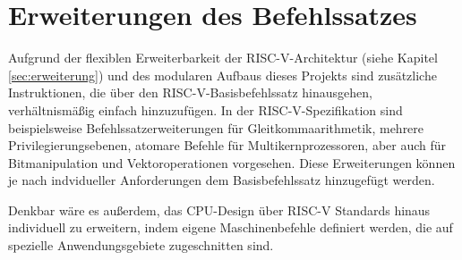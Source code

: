 \section{Erweiterungen des Befehlssatzes}

Aufgrund der flexiblen Erweiterbarkeit der RISC-V-Architektur (siehe Kapitel \ref{sec:erweiterung}) und des modularen Aufbaus dieses Projekts sind zusätzliche Instruktionen, die über den RISC-V-Basisbefehlssatz hinausgehen, verhältnismäßig einfach hinzuzufügen. In der RISC-V-Spezifikation sind beispielsweise Befehlssatzerweiterungen für Gleitkommaarithmetik, mehrere Privilegierungsebenen, atomare Befehle für Multikernprozessoren, aber auch für Bitmanipulation und Vektoroperationen vorgesehen. \cite[S. 4f.]{RISC} Diese Erweiterungen können je nach indvidueller Anforderungen dem Basisbefehlssatz hinzugefügt werden.
 
Denkbar wäre es außerdem, das CPU-Design über RISC-V Standards hinaus individuell zu erweitern, indem eigene Maschinenbefehle definiert werden, die auf spezielle Anwendungsgebiete zugeschnitten sind.



